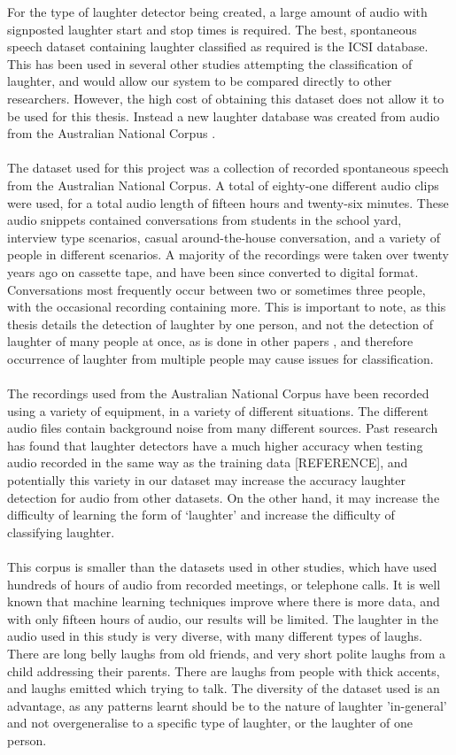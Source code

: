\documentclass[a4paper,11pt,notitlepage]{article}
\begin{document}
For the type of laughter detector being created, a large amount of audio with signposted laughter start and stop times is required. The best, spontaneous speech dataset containing laughter classified as required is the ICSI database. This has been used in several other studies attempting the classification of laughter, and would allow our system to be compared directly to other researchers. However, the high cost of obtaining this dataset does not allow it to be used for this thesis. Instead a new laughter database was created from audio from the Australian National Corpus \cite{johnston2009creating}.\\
\\
The dataset used for this project was a collection of recorded spontaneous speech from the Australian National Corpus. A total of eighty-one different audio clips were used, for a total audio length of fifteen hours and twenty-six minutes. These audio snippets contained conversations from students in the school yard, interview type scenarios, casual around-the-house conversation, and a variety of people in different scenarios. A majority of the recordings were taken over twenty years ago on cassette tape, and have been since converted to digital format. Conversations most frequently occur between two or sometimes three people, with the occasional recording containing more. This is important to note, as this thesis details the detection of laughter by one person, and not the detection of laughter of many people at once, as is done in other papers \cite{kennedy2004laughter}, and therefore occurrence of laughter from multiple people may cause issues for classification.\\
\\
The recordings used from the Australian National Corpus have been recorded using a variety of equipment, in a variety of different situations. The different audio files contain background noise from many different sources. Past research has found that laughter detectors have a much higher accuracy when testing audio recorded in the same way as the training data [REFERENCE], and potentially this variety in our dataset may increase the accuracy laughter detection for audio from other datasets. On the other hand, it may increase the difficulty of learning the form of `laughter' and increase the difficulty of classifying laughter.\\
\\
This corpus is smaller than the datasets used in other studies, which have used hundreds of hours of audio from recorded meetings, or telephone calls. It is well known that machine learning techniques improve where there is more data, and with only fifteen hours of audio, our results will be limited. The laughter in the audio used in this study is very diverse, with many different types of laughs. There are long belly laughs from old friends, and very short polite laughs from a child addressing their parents. There are laughs from people with thick accents, and laughs emitted which trying to talk. The diversity of the dataset used is an advantage, as any patterns learnt should be to the nature of laughter 'in-general' and not overgeneralise to a specific type of laughter, or the laughter of one person.\\
\end{document}
